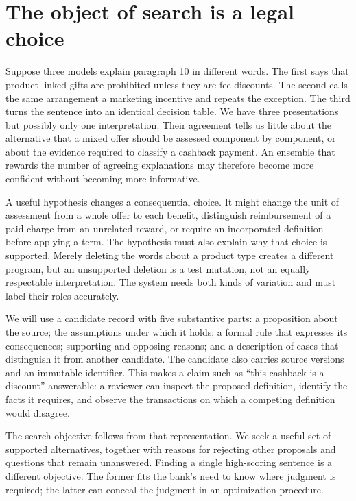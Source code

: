 \documentclass[12pt,a4paper,oneside,openany]{book}
\begin{document}
\section{The object of search is a legal choice}
\label{merge:M05:00}


Suppose three models explain paragraph 10 in different words. The first says that
product-linked gifts are prohibited unless they are fee discounts. The second
calls the same arrangement a marketing incentive and repeats the exception. The
third turns the sentence into an identical decision table. We have three
presentations but possibly only one interpretation. Their agreement tells us
little about the alternative that a mixed offer should be assessed component by
component, or about the evidence required to classify a cashback payment. An
ensemble that rewards the number of agreeing explanations may therefore become
more confident without becoming more informative.

A useful hypothesis changes a consequential choice. It might change the unit of
assessment from a whole offer to each benefit, distinguish reimbursement of a
paid charge from an unrelated reward, or require an incorporated definition
before applying a term. The hypothesis must also explain why that choice is
supported. Merely deleting the words about a product type creates a different
program, but an unsupported deletion is a test mutation, not an equally
respectable interpretation. The system needs both kinds of variation and must
label their roles accurately.

We will use a candidate record with five substantive parts: a proposition about
the source; the assumptions under which it holds; a formal rule that expresses
its consequences; supporting and opposing reasons; and a description of cases
that distinguish it from another candidate. The candidate also carries source
versions and an immutable identifier. This makes a claim such as ``this cashback
is a discount'' answerable: a reviewer can inspect the proposed definition,
identify the facts it requires, and observe the transactions on which a competing
definition would disagree.

The search objective follows from that representation. We seek a useful set of
supported alternatives, together with reasons for rejecting other proposals and
questions that remain unanswered. Finding a single high-scoring sentence is a
different objective. The former fits the bank's need to know where judgment is
required; the latter can conceal the judgment in an optimization procedure.
\end{document}
